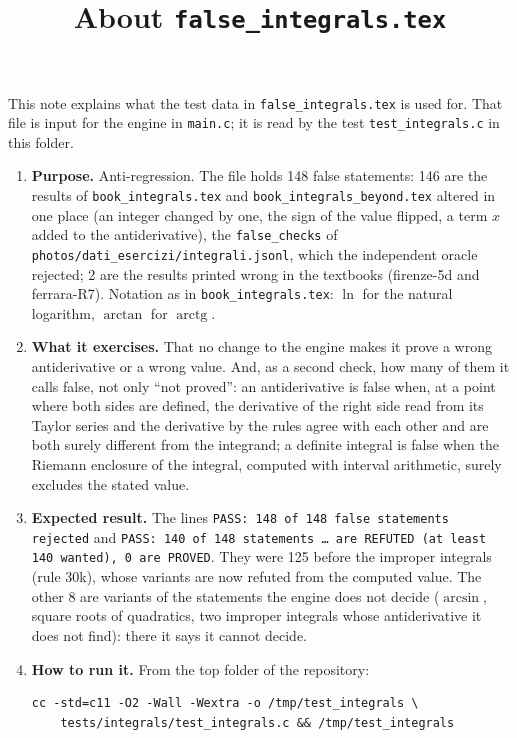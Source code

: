 \documentclass[11pt,a4paper]{article}
\title{About \texttt{false\_integrals.tex}}
\author{}
\date{}
\begin{document}
\maketitle
This note explains what the test data in \texttt{false\_integrals.tex} is used for. That file is input for the engine in \texttt{main.c}; it is read by the test \texttt{test\_integrals.c} in this folder.

\begin{enumerate}
\item \textbf{Purpose.} Anti-regression. The file holds 148 false statements: 146 are the results of \texttt{book\_integrals.tex} and \texttt{book\_integrals\_beyond.tex} altered in one place (an integer changed by one, the sign of the value flipped, a term $x$ added to the antiderivative), the \texttt{false\_checks} of \texttt{photos/dati\_esercizi/integrali.jsonl}, which the independent oracle rejected; 2 are the results printed wrong in the textbooks (firenze-5d and ferrara-R7). Notation as in \texttt{book\_integrals.tex}: $\ln$ for the natural logarithm, $\arctan$ for $\operatorname{arctg}$.

\item \textbf{What it exercises.} That no change to the engine makes it prove a wrong antiderivative or a wrong value. And, as a second check, how many of them it calls false, not only ``not proved'': an antiderivative is false when, at a point where both sides are defined, the derivative of the right side read from its Taylor series and the derivative by the rules agree with each other and are both surely different from the integrand; a definite integral is false when the Riemann enclosure of the integral, computed with interval arithmetic, surely excludes the stated value.

\item \textbf{Expected result.} The lines \texttt{PASS: 148 of 148 false statements rejected} and \texttt{PASS: 140 of 148 statements \ldots{} are REFUTED (at least 140 wanted), 0 are PROVED}. They were 125 before the improper integrals (rule 30k), whose variants are now refuted from the computed value. The other 8 are variants of the statements the engine does not decide ($\arcsin$, square roots of quadratics, two improper integrals whose antiderivative it does not find): there it says it cannot decide.

\item \textbf{How to run it.} From the top folder of the repository:
\begin{verbatim}
cc -std=c11 -O2 -Wall -Wextra -o /tmp/test_integrals \
    tests/integrals/test_integrals.c && /tmp/test_integrals
\end{verbatim}
\end{enumerate}
\end{document}
